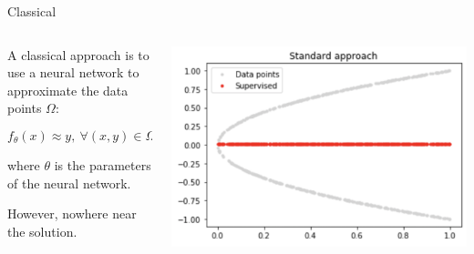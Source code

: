 \documentclass[aspectratio=1610,xcolor={dvipsnames},hyperref={colorlinks,unicode,linkcolor=violet,anchorcolor=BlueViolet,citecolor=YellowOrange,filecolor=black,urlcolor=Aquamarine}]{beamer}
\begin{document}
\begin{frame}[label={sec:org606edee}]{Classical}
\begin{columns}
\begin{column}{0.4\columnwidth}
A classical approach is to use a neural network to approximate the data points \(\Omega\):

\[f_{\theta}(x) \approx y,\ \forall (x, y) \in \Omega\]

where \(\theta\) is the parameters of the neural network.

However, nowhere near the solution.
\end{column}

\begin{column}{0.6\columnwidth}
\begin{center}
\includegraphics[width=.9\linewidth]{./p2.png}
\end{center}
\end{column}
\end{columns}
\end{frame}
\end{document}
